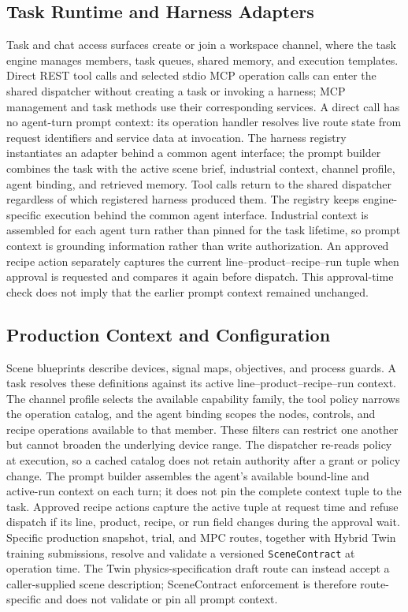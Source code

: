 \subsection{Task Runtime and Harness Adapters}
Task and chat access surfaces create or join a workspace channel, where the
task engine manages members, task queues, shared memory, and execution
templates. Direct REST tool calls and selected stdio MCP operation calls can
enter the shared dispatcher without creating a task or invoking a harness;
MCP management and task methods use their corresponding services. A direct
call has no agent-turn prompt context: its operation handler resolves live
route state from request identifiers and service data at invocation.
The harness registry instantiates an adapter behind a common agent interface;
the prompt builder combines the task with the active scene brief, industrial
context, channel profile, agent binding, and retrieved memory. Tool calls
return to the shared dispatcher regardless of which registered harness
produced them. The registry keeps engine-specific execution behind the common
agent interface. Industrial context is assembled for
each agent turn rather than pinned for the task lifetime, so prompt context is
grounding information rather than write authorization. An approved recipe
action separately captures the current line--product--recipe--run tuple when
approval is requested and compares it again before dispatch. This
approval-time check does not imply that the earlier prompt context remained
unchanged.

\subsection{Production Context and Configuration}
Scene blueprints describe devices, signal maps, objectives, and process
guards. A task resolves these definitions against its active
line--product--recipe--run context. The channel profile selects the available
capability family, the tool policy narrows the operation catalog, and the
agent binding scopes the nodes, controls, and recipe operations available to
that member. These filters can restrict one another but cannot broaden the
underlying device range. The dispatcher re-reads policy at execution, so a
cached catalog does not retain authority after a grant or policy change. The
prompt builder assembles the agent's available bound-line and active-run
context on each turn; it does not pin the complete context tuple to the task.
Approved recipe actions capture the active tuple at request time and refuse
dispatch if its line, product, recipe, or run field changes during the
approval wait.
Specific production snapshot, trial, and MPC routes, together with Hybrid Twin
training submissions, resolve and validate a versioned \texttt{SceneContract}
at operation time. The Twin physics-specification draft route can instead
accept a caller-supplied scene description; SceneContract enforcement is
therefore route-specific and does not validate or pin all prompt context.

